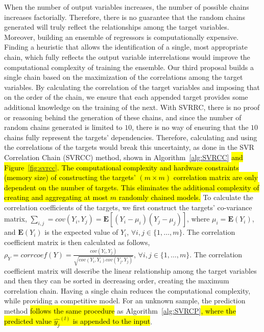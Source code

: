 \documentclass[preprint,12pt]{elsarticle}
\begin{document}
When the number of output variables increases, the number of possible chains increases factorially. Therefore, there is no guarantee that the random chains generated will truly reflect the relationships among the target variables. Moreover, building an ensemble of regressors is computationally expensive. Finding a heuristic that allows the identification of a single, most appropriate chain, which fully reflects the output variable interrelations would improve the computational complexity of training the ensemble. Our third proposal builds a single chain based on the maximization of the correlations among the target variables. By calculating the correlation of the target variables and imposing that on the order of the chain, we ensure that each appended target provides some additional knowledge on the training of the next. With SVRRC, there is no proof or reasoning behind the generation of these chains, and since the number of random chains generated is limited to $10$, there is no way of ensuring that the $10$ chains fully represent the targets' dependencies. Therefore, calculating and using the correlations of the targets would break this uncertainty, as done in the SVR Correlation Chain (SVRCC) method, shown in Algorithm~\ref{alg:SVRCC} \hl{and Figure~{\ref{fig:svrcc}}. The computational complexity and hardware constraints (memory size) of constructing the targets' $(m \times m)$ correlation matrix are only dependent on the number of targets. This eliminates the additional complexity of creating and aggregating at most $m$ randomly chained models.} To calculate the correlation coefficients of the targets, we first construct the targets' co-variance matrix, $\sum_{i,j} = cov(Y_i,Y_j) = \mathbf{E}\left[(Y_i - \mu_i)(Y_j - \mu_j)\right]$, where $\mu_i = \mathbf{E}(Y_i)$, and $\mathbf{E}(Y_i)$ is the expected value of $Y_i$, $\forall i,j \in \{1,\ldots,m\}$. The correlation coefficient matrix is then calculated as follows, $\rho_Y = corrcoef(Y) = \frac{cov(Y_i,Y_j)}{\sqrt{cov(Y_i,Y_i)cov(Y_j,Y_j)}}$, $\forall i,j \in \{1,\ldots,m\}$. The correlation coefficient matrix will describe the linear relationship among the target variables and then they can be sorted in decreasing order, creating the maximum correlation chain. Having a single chain reduces the computational complexity, while providing a competitive model. For an unknown sample, the prediction method  \hl{follows the same procedure} as Algorithm~\ref{alg:SVRCP}\hl{, where the predicted value $\hat{y_j}^{(l)}$ is appended to the input}. 
\end{document}

